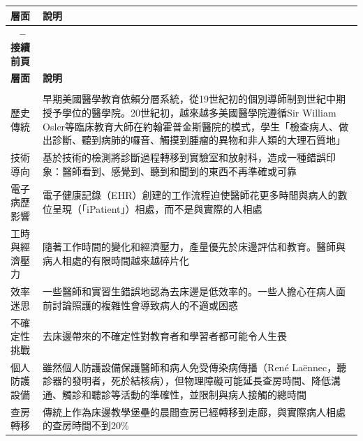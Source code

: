 \documentclass[12pt,a4paper]{article}
\begin{document}
\begin{longtable}{>{\raggedright\arraybackslash}p{4cm} >{\raggedright\arraybackslash}p{11cm}}
\toprule
\textbf{\textcolor{emergency_red}{層面}} & \textbf{\textcolor{emergency_red}{說明}} \\
\midrule
\endfirsthead

\multicolumn{2}{c}%
{{\bfseries \tablename\ \thetable{} -- 接續前頁}} \\
\toprule
\textbf{\textcolor{emergency_red}{層面}} & \textbf{\textcolor{emergency_red}{說明}} \\
\midrule
\endhead

\midrule \multicolumn{2}{r}{{接續下頁}} \\ \midrule
\endfoot

\bottomrule
\endlastfoot

\textcolor{emergency_blue}{歷史傳統} & 早期美國醫學教育依賴分層系統，從19世紀初的個別導師制到世紀中期授予學位的醫學院。20世紀初，越來越多美國醫學院遵循Sir William Osler等臨床教育大師在約翰霍普金斯醫院的模式，學生「檢查病人、做出診斷、聽到病肺的囉音、觸摸到腫瘤的異物和非人類的大理石質地」 \\

\textcolor{emergency_blue}{技術導向} & 基於技術的檢測將診斷過程轉移到實驗室和放射科，造成一種錯誤印象：醫師看到、感覺到、聽到和聞到的東西不再準確或可靠 \\

\textcolor{emergency_blue}{電子病歷影響} & 電子健康記錄（EHR）創建的工作流程迫使醫師花更多時間與病人的數位呈現（「iPatient」）相處，而不是與實際的人相處 \\

\textcolor{emergency_blue}{工時與經濟壓力} & 隨著工作時間的變化和經濟壓力，產量優先於床邊評估和教育。醫師與病人相處的有限時間越來越碎片化 \\

\textcolor{emergency_blue}{效率迷思} & 一些醫師和實習生錯誤地認為去床邊是低效率的。一些人擔心在病人面前討論照護的複雜性會導致病人的不適或困惑 \\

\textcolor{emergency_blue}{不確定性挑戰} & 去床邊帶來的不確定性對教育者和學習者都可能令人生畏 \\

\textcolor{emergency_blue}{個人防護設備} & 雖然個人防護設備保護醫師和病人免受傳染病傳播（René Laënnec，聽診器的發明者，死於結核病），但物理障礙可能延長查房時間、降低溝通、觸診和聽診等活動的準確性，並限制與病人接觸的總時間 \\

\textcolor{emergency_blue}{查房轉移} & 傳統上作為床邊教學堡壘的晨間查房已經轉移到走廊，與實際病人相處的查房時間不到20\% \\
\end{longtable}
\end{document}
